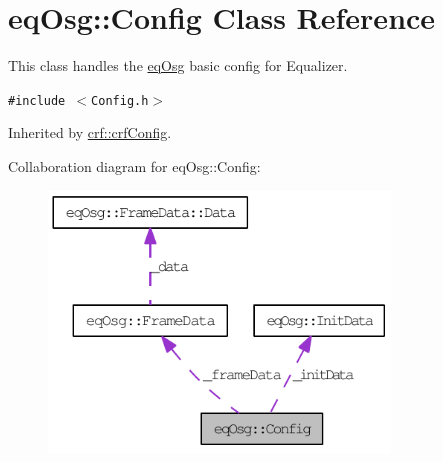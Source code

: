 \hypertarget{a00003}{
\section{eqOsg::Config Class Reference}
\label{a00003}
}
This class handles the \hyperlink{a00045}{eqOsg} basic config for Equalizer.  


{\tt \#include $<$Config.h$>$}

Inherited by \hyperlink{a00004}{crf::crfConfig}.

Collaboration diagram for eqOsg::Config:\nopagebreak
\begin{figure}[H]
\begin{center}
\leavevmode
\includegraphics[width=257pt]{a00090}
\end{center}
\end{figure}

